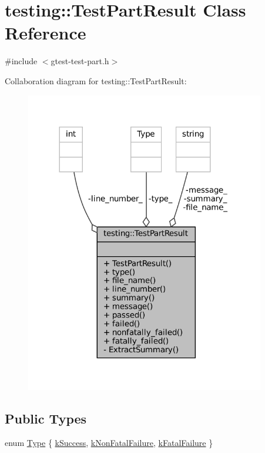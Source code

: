 \hypertarget{classtesting_1_1TestPartResult}{}\section{testing\+:\+:Test\+Part\+Result Class Reference}
\label{classtesting_1_1TestPartResult}


{\ttfamily \#include $<$gtest-\/test-\/part.\+h$>$}



Collaboration diagram for testing\+:\+:Test\+Part\+Result\+:
\nopagebreak
\begin{figure}[H]
\begin{center}
\leavevmode
\includegraphics[width=296pt]{classtesting_1_1TestPartResult__coll__graph}
\end{center}
\end{figure}
\subsection*{Public Types}
\begin{DoxyCompactItemize}
\item 
enum \hyperlink{classtesting_1_1TestPartResult_a65ae656b33fdfdfffaf34858778a52d5}{Type} \{ \hyperlink{classtesting_1_1TestPartResult_a65ae656b33fdfdfffaf34858778a52d5a8fa3d06b2baad8bf7c1f17dea314983e}{k\+Success}, 
\hyperlink{classtesting_1_1TestPartResult_a65ae656b33fdfdfffaf34858778a52d5a00a755614f8ec3f78b2e951f8c91cd92}{k\+Non\+Fatal\+Failure}, 
\hyperlink{classtesting_1_1TestPartResult_a65ae656b33fdfdfffaf34858778a52d5ae1bf0b610b697a43fee97628cdab4ea1}{k\+Fatal\+Failure}
 \}
\end{DoxyCompactItemize}

